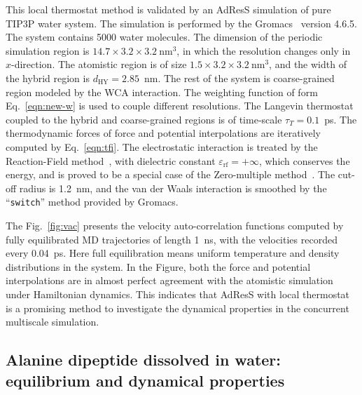 \documentclass[epjST]{svjour}
\newcommand{\recheck}[1]{{\color{red} #1}}
\newcommand{\HY}[0]{\textrm{HY}}
\begin{document}
This local thermostat method is validated by an AdResS simulation of pure TIP3P
water system.
The simulation is performed by the Gromacs~\cite{pronk2013gromacs} version 4.6.5.
The system contains 5000 water molecules.  The dimension of the periodic
simulation region is $14.7\times3.2\times3.2~\textrm{nm}^3$,
in which the resolution changes only in $x$-direction.
The atomistic region is of size $1.5\times3.2\times3.2~\textrm{nm}^3$, and the width of the hybrid region is $d_{\HY} = 2.85$~nm.
The rest of the system is coarse-grained region modeled by the WCA interaction.
The weighting function of form Eq.~\eqref{eqn:new-w} is used to couple different resolutions.
The Langevin thermostat coupled to the hybrid and coarse-grained regions is of time-scale $\tau_T = 0.1$~ps.
The thermodynamic forces of force and potential interpolations are iteratively computed by
Eq.~\eqref{eqn:tfi}.
The electrostatic interaction is treated by the Reaction-Field method~\cite{onsager1936electric,tironi1995generalized},
with dielectric constant $\varepsilon_{\textrm{rf}} = +\infty$, which conserves the energy, and
is proved to be a special case of the  Zero-multiple method~\cite{fukuda2011molecular,fukuda2013zero}.
The cut-off radius is 1.2~nm, and the van der Waals interaction is smoothed by the ``\texttt{switch}'' method provided by
Gromacs.

The Fig.~\ref{fig:vac} presents the velocity auto-correlation
functions computed by fully equilibrated MD trajectories of length 1~ns, with the
velocities recorded every 0.04~ps.  Here full equilibration means
uniform temperature and density distributions in the system.
In the Figure, both the force and potential interpolations are
in almost perfect agreement with the  atomistic simulation under Hamiltonian dynamics.
This indicates that AdResS with local thermostat
is a promising method to investigate the dynamical properties
in the concurrent multiscale simulation.




\subsection{Alanine dipeptide dissolved in water: equilibrium and dynamical properties}
\end{document}
